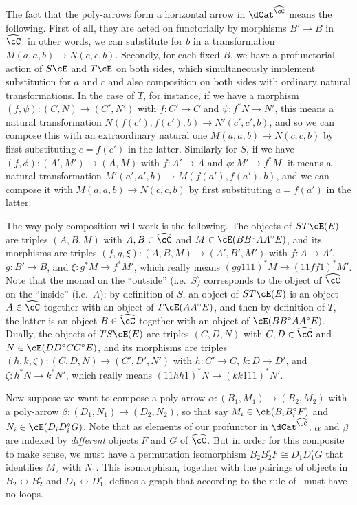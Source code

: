\documentclass{amsart}
\newcommand{\C}{\cC}
\renewcommand{\Chat}{\ensuremath{\widehat{\C}}\xspace}
\newcommand{\E}{\cE}
\renewcommand{\o}{^{\circ}}
\begin{document}
The fact that the poly-arrows form a horizontal arrow \cM in $\dCat^{\Chat}$ means the following.
First of all, they are acted on functorially by morphisms $B'\to B$ in $\Chat$: in other words, we can substitute for $b$ in a transformation $M(a,a,b) \to N(c,c,b)$.
Secondly, for each fixed $B$, we have a profunctorial action of $S\E$ and $T\E$ on both sides, which simultaneously implement substitution for $a$ and $c$ and also composition on both sides with ordinary natural transformations.
In the case of $T$, for instance, if we have a morphism $(f,\psi) : (C,N)\to (C',N')$ with $f:C'\to C$ and $\psi : f^* N \to N'$, this means a natural transformation $N(f(c'),f(c'),b) \to N'(c',c',b)$, and so we can compose this with an extraordinary natural one $M(a,a,b) \to N(c,c,b)$ by first substituting $c=f(c')$ in the latter.
Similarly for $S$, if we have $(f,\phi) : (A',M')\to (A,M)$ with $f:A'\to A$ and $\phi : M' \to f^*M$, it means a natural transformation $M'(a',a',b) \to M(f(a'),f(a'),b)$, and we can compose it with $M(a,a,b) \to N(c,c,b)$ by first substituting $a=f(a')$ in the latter.

The way poly-composition will work is the following.
The objects of $ST\E(E)$ are triples $(A,B,M)$ with $A,B\in \Chat$ and $M\in \E(B B\o A A\o E)$, and its morphisms are triples $(f,g,\xi):(A,B,M) \to (A',B',M')$ with $f:A\to A'$, $g:B'\to B$, and $\xi:g^*M \to f^*M'$, which really means $(gg111)^*M \to (11ff1)^*M'$.
Note that the monad on the ``outside'' (i.e.\ $S$) corresponds to the object of \Chat on the ``inside'' (i.e.\ $A$): by definition of $S$, an object of $ST\E(E)$ is an object $A\in\Chat$ together with an object of $T\E(A A\o E)$, and then by definition of $T$, the latter is an object $B\in\Chat$ together with an object of $\E(B B\o A A\o E)$.
Dually, the objects of $TS\E(E)$ are triples $(C,D,N)$ with $C,D\in \Chat$ and $N\in \E(D D\o C C\o E)$, and its morphisms are triples $(h,k,\zeta):(C,D,N) \to (C',D',N')$ with $h:C'\to C$, $k:D\to D'$, and $\zeta:h^*N \to k^*N'$, which really means $(11hh1)^*N \to (kk111)^*N'$.

Now suppose we want to compose a poly-arrow $\alpha : (B_1,M_1)\to (B_2,M_2)$ with a poly-arrow $\beta : (D_1,N_1) \to (D_2,N_2)$, so that say $M_i\in \E(B_i B_i\o F)$ and $N_i\in \E(D_i D_i\o G)$.
Note that as elements of our profunctor \cM in $\dCat^{\Chat}$, $\alpha$ and $\beta$ are indexed by \emph{different} objects $F$ and $G$ of \Chat.
But in order for this composite to make sense, we must have a permutation isomorphism $B_2 B_2\o F \cong D_1 D_1\o G$ that identifies $M_2$ with $N_1$.
This isomorphism, together with the pairings of objects in $B_2\leftrightarrow B_2\o$ and $D_1 \leftrightarrow D_1\o$, defines a graph that according to the rule of~\cite{ek:gen-funct-calc} must have no loops.
\end{document}
